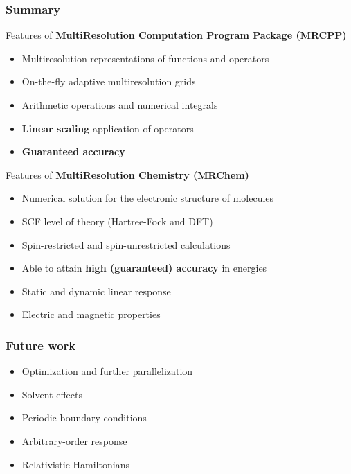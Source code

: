 
\begin{frame}
    \frametitle{Summary}
    \scriptsize
    Features of \textbf{MultiResolution Computation Program Package (MRCPP)}
    \begin{itemize}
        \item   Multiresolution representations of functions and operators
        \item   On-the-fly adaptive multiresolution grids
        \item   Arithmetic operations and numerical integrals
        \item   \textbf{Linear scaling} application of operators
        \item   \textbf{Guaranteed accuracy}
    \end{itemize}
    \vspace{5mm}
    \pause
    Features of \textbf{MultiResolution Chemistry (MRChem)}
    \begin{itemize}
        \item   Numerical solution for the electronic structure of molecules
        \item   SCF level of theory (Hartree-Fock and DFT)
        \item   Spin-restricted and spin-unrestricted calculations
        \item   Able to attain \textbf{high (guaranteed) accuracy} in energies
        \item   Static and dynamic linear response
	\item	Electric and magnetic properties
    \end{itemize}
    \vspace{5mm}
\end{frame}

\begin{frame}
    \scriptsize
    \frametitle{Future work}
    \begin{itemize}
        \item   Optimization and further parallelization
        \item   Solvent effects
        \item   Periodic boundary conditions
        \item   Arbitrary-order response
        \item   Relativistic Hamiltonians
    \end{itemize}
\end{frame}

